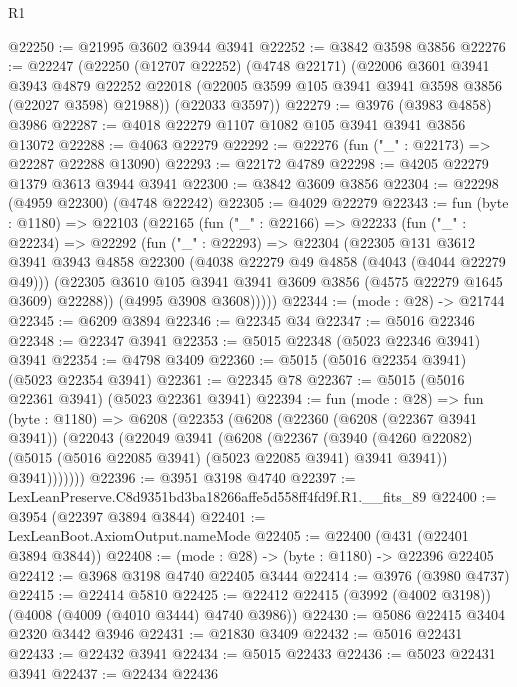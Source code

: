 \begin{lexlean}{R1}
\begin{coremodule}
@22250 := @21995 @3602 @3944 @3941
@22252 := @3842 @3598 @3856
@22276 := @22247
    (@22250
      (@12707 @22252)
      (@4748 @22171)
      (@22006
        @3601
        @3941
        @3943
        @4879
        @22252
        @22018
        (@22005 @3599 @105 @3941 @3941 @3598 @3856 (@22027 @3598) @21988))
      (@22033 @3597))
@22279 := @3976 (@3983 @4858) @3986
@22287 := @4018 @22279 @1107 @1082 @105 @3941 @3941 @3856 @13072
@22288 := @4063 @22279
@22292 := @22276 (fun ("_" : @22173) => @22287 @22288 @13090)
@22293 := @22172 @4789
@22298 := @4205 @22279 @1379 @3613 @3944 @3941
@22300 := @3842 @3609 @3856
@22304 := @22298 (@4959 @22300) (@4748 @22242)
@22305 := @4029 @22279
@22343 := fun (byte : @1180) =>
  @22103
    (@22165
      (fun ("_" : @22166) =>
      @22233
        (fun ("_" : @22234) =>
        @22292
          (fun ("_" : @22293) =>
          @22304
            (@22305
              @131
              @3612
              @3941
              @3943
              @4858
              @22300
              (@4038 @22279 @49 @4858 (@4043 (@4044 @22279 @49)))
              (@22305 @3610 @105 @3941 @3941 @3609 @3856 (@4575 @22279 @1645 @3609) @22288))
            (@4995 @3908 @3608)))))
@22344 := (mode : @28) -> @21744
@22345 := @6209 @3894
@22346 := @22345 @34
@22347 := @5016 @22346
@22348 := @22347 @3941
@22353 := @5015 @22348 (@5023 @22346 @3941) @3941
@22354 := @4798 @3409
@22360 := @5015 (@5016 @22354 @3941) (@5023 @22354 @3941)
@22361 := @22345 @78
@22367 := @5015 (@5016 @22361 @3941) (@5023 @22361 @3941)
@22394 := fun (mode : @28) =>
  fun (byte : @1180) =>
  @6208
    (@22353
      (@6208
        (@22360
          (@6208 (@22367 @3941 @3941))
          (@22043
            (@22049
              @3941
              (@6208
                (@22367
                  (@3940
                    (@4260 @22082)
                    (@5015 (@5016 @22085 @3941) (@5023 @22085 @3941) @3941 @3941))
                  @3941)))))))
@22396 := @3951 @3198 @4740
@22397 := LexLeanPreserve.C8d9351bd3ba18266affe5d558ff4fd9f.R1.__fits_89
@22400 := @3954 (@22397 @3894 @3844)
@22401 := LexLeanBoot.AxiomOutput.nameMode
@22405 := @22400 (@431 (@22401 @3894 @3844))
@22408 := (mode : @28) -> (byte : @1180) -> @22396 @22405
@22412 := @3968 @3198 @4740 @22405 @3444
@22414 := @3976 (@3980 @4737)
@22415 := @22414 @5810
@22425 := @22412 @22415 (@3992 (@4002 @3198)) (@4008 (@4009 (@4010 @3444) @4740 @3986))
@22430 := @5086 @22415 @3404 @2320 @3442 @3946
@22431 := @21830 @3409
@22432 := @5016 @22431
@22433 := @22432 @3941
@22434 := @5015 @22433
@22436 := @5023 @22431 @3941
@22437 := @22434 @22436

\end{coremodule}
\end{lexlean}
